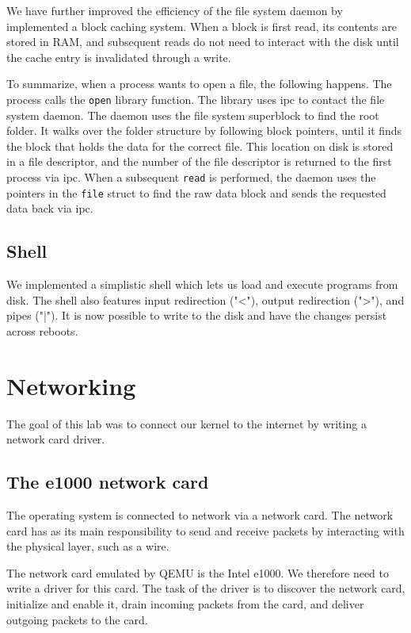 \documentclass{article}
\begin{document}
We have further improved the efficiency of the file system daemon by
implemented a block caching system. When a block is first read, its contents
are stored in RAM, and subsequent reads do not need to interact with the disk
until the cache entry is invalidated through a write.



To summarize, when a process wants to open a file, the following happens. The
process calls the \texttt{open} library function. The library uses \gls{ipc}
to contact the file system daemon. The daemon uses the file system superblock
to find the root folder. It walks over the folder structure by following block
pointers, until it finds the block that holds the data for the correct file.
This location on disk is stored in a file descriptor, and the number of the
file descriptor is returned to the first process via \gls{ipc}. When a
subsequent \texttt{read} is performed, the daemon uses the pointers in the
\texttt{file} struct to find the raw data block and sends the requested data
back via \gls{ipc}.



\subsection{Shell}
We implemented a simplistic shell which lets us load and execute programs from
disk. The shell also features input redirection ("<"), output redirection
(">"), and pipes ("|"). It is now possible to write to the disk and have the
changes persist across reboots.




\section{Networking}
The goal of this lab was to connect our kernel to the internet by writing a
network card driver.

\subsection{The e1000 network card}
The operating system is connected to network via a network card. The network
card has as its main responsibility to send and receive packets by interacting
with the physical layer, such as a wire.

The network card emulated by QEMU is the Intel e1000. We therefore need to
write a driver for this card. The task of the driver is to discover the
network card, initialize and enable it, drain incoming packets from the card,
and deliver outgoing packets to the card.
\end{document}
